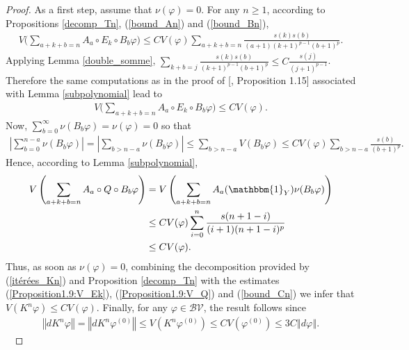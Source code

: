 \documentclass{ws-sd}
\newcommand{\indic}{\mathbbm{1}}
\newcommand{\norm}[1]{\left\Vert #1\right\Vert}
\newcommand{\abs}[1]{\left\lvert #1 \right\rvert}
\newcommand\bigp[1]{\left(#1\right)}
\begin{document}
\begin{proof}
As a first step, assume that $\nu(\varphi) = 0$.
For any $n \ge 1$, according to Propositions \ref{decomp_Tn}, (\ref{bound_An}) and (\ref{bound_Bn}),
\begin{align*}
    V \Big( \sum_{a+k+b=n} A_a \circ E_k \circ B_b \varphi \Big) \le CV(\varphi) \sum_{a+k+b = n} \frac{s(k) s(b)}{(a+1)(k+1)^{p-1}(b+1)^p}.
\end{align*}
Applying Lemma \ref{double_somme}, $\sum_{k+b = j}\frac{s(k)s(b)}{(k+1)^{p-1}(b+1)^{p}} \le C\frac{s(j)}{(j+1)^{p-1}}$. Therefore the same computations as in the proof of [, Proposition 1.15] associated with Lemma \ref{subpolynomial} lead to
\begin{align}
        \label{Proposition1.9:V_Ek}
    V \Big( \sum_{a+k+b=n} A_a \circ E_k \circ B_b \varphi\Big) \le CV(\varphi).
\end{align}
Now, $\sum_{b=0}^{\infty}\nu(B_b\varphi) = \nu(\varphi) = 0$ so that
    \begin{align}
            \label{Proposition1.9:V_Q_B}
        \abs{\sum_{b=0}^{n-a}\nu(B_b\varphi)}
        = \abs{\sum_{b > n-a}\nu(B_b\varphi)}
        \le \sum_{b > n-a} V(B_b\varphi)
        \le CV(\varphi) \sum_{b > n-a} \frac{s(b)}{(b+1)^p}.
    \end{align}
Hence, according to Lemma \ref{subpolynomial},
\begin{align}
        \label{Proposition1.9:V_Q}
    V\bigp{\sum_{a+k+b = n}A_a \circ Q \circ B_b \varphi}
    &=
    V\bigp{\sum_{a+k+b = n}A_a(\indic_Y) \nu(B_b \varphi)}\nonumber
    \\ &\le
    C V(\varphi)\sum_{i = 0}^n \frac{s(n+1-i)}{(i+1)(n+1-i)^p}\nonumber
    \\ & \le
    CV(\varphi).
\end{align}
Thus, as soon as $\nu(\varphi) =0$, combining the decomposition provided by (\ref{itérées_Kn}) and Proposition \ref{decomp_Tn} with the estimates (\ref{Proposition1.9:V_Ek}), (\ref{Proposition1.9:V_Q}) and (\ref{bound_Cn}) we infer that $V(K^n\varphi) \le CV(\varphi)$.
Finally, for any $\varphi \in \mathcal{BV}$, the result follows since
\begin{align*}
    \norm{dK^n\varphi}
    =\norm{dK^n\varphi^{(0)}}
    \le V(K^n\varphi ^{(0)})
    \le CV(\varphi^{(0)})
    \le 3C\norm{d\varphi}.
\end{align*}~
\end{proof}
\end{document}

